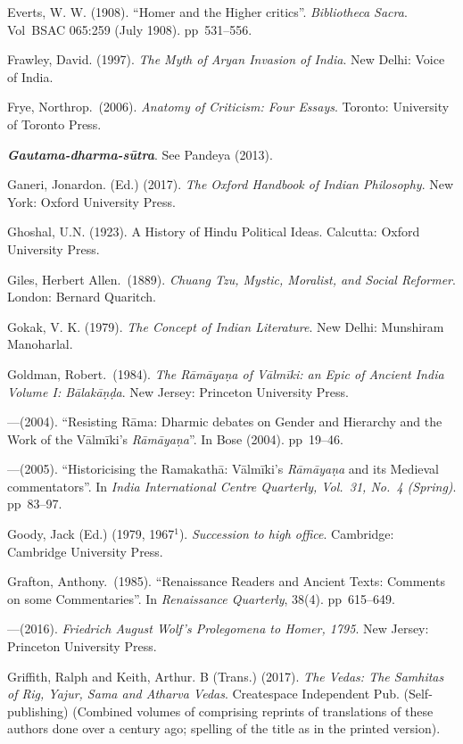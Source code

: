 \begin{thebibliography}{99}
Everts, W. W. (1908). “Homer and the Higher critics”. {\sl Bibliotheca Sacra}. Vol BSAC 065:259 (July 1908). pp~531--556. 

Frawley, David. (1997). {\sl The Myth of Aryan Invasion of India}.  New Delhi: Voice of India. 

Frye, Northrop.\ (2006). {\sl Anatomy of Criticism: Four Essays}. Toronto: University of Toronto Press. 

{\sl\bfseries Gautama-dharma-sūtra}. See Pandeya (2013). 

Ganeri, Jonardon. (Ed.) (2017). {\sl The Oxford Handbook of Indian Philosophy}. New York: Oxford University Press. 

Ghoshal, U.N. (1923). A History of Hindu Political Ideas. Calcutta: Oxford University Press. 

Giles, Herbert Allen.\ (1889). {\sl Chuang Tzu, Mystic, Moralist, and Social Reformer}. London: Bernard Quaritch. 

Gokak, V. K.  (1979). {\sl The Concept of Indian Literature}. New Delhi: Munshiram Manoharlal. 

Goldman, Robert.\ (1984). {\sl The Rāmāyaṇa of Vālmīki: an Epic of Ancient India Volume I: Bālakāṇḍa}. New Jersey: Princeton University Press. 

---\kern3pt(2004). “Resisting Rāma: Dharmic debates on Gender and Hierarchy and the Work of the Vālmīki’s {\sl Rāmāyaṇa}”. In Bose (2004). pp~19--46. 

---\kern3pt(2005). “Historicising the Ramakathā: Vālmīki's {\sl Rāmāyaṇa} and its Medieval commentators”. In {\sl India International Centre Quarterly, Vol.~31, No.~4 (Spring)}. pp~83--97.

Goody, Jack (Ed.) (1979, 1967$^{1}$). {\sl Succession to high office}. Cambridge: Cambridge University Press. 

Grafton, Anthony.\ (1985). “Renaissance Readers and Ancient Texts: Comments on some Commentaries”. In {\sl Renaissance Quarterly}, 38(4). pp~615--649.

---\kern3pt(2016). {\sl Friedrich August Wolf’s Prolegomena to Homer, 1795}.  New Jersey: Princeton University Press. 

Griffith, Ralph and Keith, Arthur. B (Trans.) (2017). {\sl The Vedas: The Samhitas of Rig, Yajur, Sama and Atharva Vedas}. Createspace Independent Pub. (Self-publishing) (Combined volumes of comprising reprints of translations of these authors done over a century ago; spelling of the title as in the printed version).


\end{thebibliography}
